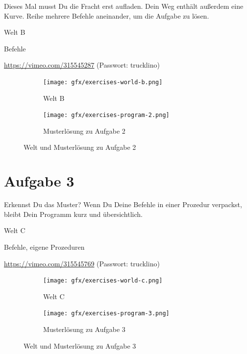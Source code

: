 Dieses Mal musst Du die Fracht erst aufladen. Dein Weg enthält außerdem eine Kurve. Reihe mehrere Befehle aneinander, um die Aufgabe zu lösen.

\begin{description}[noitemsep]
  \item[Welt wählen:] Welt B
  \item[Du brauchst:] Befehle
  \item[Video:] \url{https://vimeo.com/315545287} (Passwort: trucklino)
\end{description}

\begin{figure}[H]
  \begin{subfigure}[b]{0.40\textwidth}
    \texttt{[image: gfx/exercises-world-b.png]}
    \caption{Welt B}
  \end{subfigure}\hfill
  \begin{subfigure}[b]{0.40\textwidth}
    \texttt{[image: gfx/exercises-program-2.png]}
    \caption{Musterlösung zu Aufgabe 2}
  \end{subfigure}\hfill
  \caption{Welt und Musterlösung zu Aufgabe 2}
\end{figure}

\pagebreak

\section{Aufgabe 3}
\label{sec:exercises:3}

Erkennst Du das Muster? Wenn Du Deine Befehle in einer Prozedur verpackst, bleibt Dein Programm kurz und übersichtlich.

\begin{description}[noitemsep]
  \item[Welt wählen:] Welt C
  \item[Du brauchst:] Befehle, eigene Prozeduren
  \item[Video:] \url{https://vimeo.com/315545769} (Passwort: trucklino)
\end{description}

\begin{figure}[H]
  \begin{subfigure}[b]{0.40\textwidth}
    \texttt{[image: gfx/exercises-world-c.png]}
    \caption{Welt C}
  \end{subfigure}\hfill
  \begin{subfigure}[b]{0.40\textwidth}
    \texttt{[image: gfx/exercises-program-3.png]}
    \caption{Musterlösung zu Aufgabe 3}
  \end{subfigure}\hfill
  \caption{Welt und Musterlösung zu Aufgabe 3}
\end{figure}

